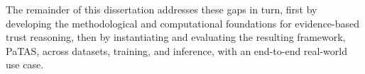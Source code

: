 The remainder of this dissertation addresses these gaps in turn, first by developing the methodological and computational foundations for evidence-based trust reasoning, then by instantiating and evaluating the resulting framework, \ac{PaTAS}, across datasets, training, and inference, with an end-to-end real-world use case.
